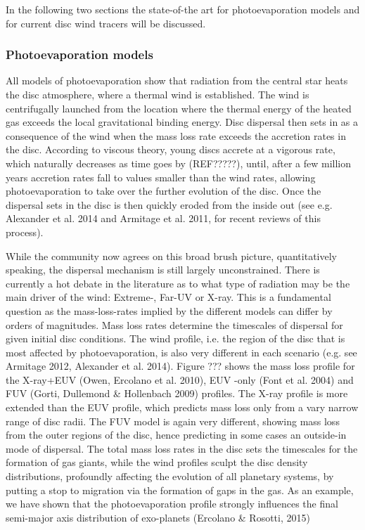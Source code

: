 \documentclass[10pt,fleqn,twoside]{article}
\begin{document}
In the following two sections the state-of-the art for photoevaporation
models and for current disc wind tracers will be discussed.
 
\subsubsection{Photoevaporation models} 

All models of photoevaporation show that radiation from the central
star heats the disc atmosphere, where a thermal  wind is established.
The wind is centrifugally launched from the location where the thermal
energy of the heated gas exceeds the local gravitational binding
energy. 
Disc dispersal then sets in as a consequence of the wind when the mass
loss rate exceeds the accretion rates in the disc. According to
viscous theory, young discs accrete
at a vigorous rate, which naturally decreases as time goes by (REF?????), until,
after a few million years accretion rates fall to values smaller than
the wind rates, allowing photoevaporation to take over the further
evolution of the disc. Once the dispersal sets in the disc is then
quickly eroded from the inside out (see e.g. Alexander et al. 2014 and
Armitage et al. 2011, for recent reviews of this process).  

While the community now agrees on this broad brush picture,
quantitatively speaking, the dispersal mechanism is still largely
unconstrained. There is currently a hot debate in the literature as to
what type of radiation may be the main driver of the wind: Extreme-,
Far-UV or X-ray. This is a fundamental question as the mass-loss-rates
implied by the different models can differ by orders of
magnitudes. Mass loss rates determine the timescales of dispersal for
given initial disc conditions. The wind profile, i.e. the region of
the disc that is most affected by photoevaporation, is also very
different in each scenario (e.g. see Armitage 2012, Alexander et
al. 2014). Figure ??? shows the mass loss profile for the X-ray+EUV
(Owen, Ercolano et al. 2010), EUV -only (Font et al. 2004) and FUV
(Gorti, Dullemond \& Hollenbach 2009) profiles. The X-ray profile is
more extended than the EUV profile, which predicts mass loss only from
a vary narrow range of disc radii. The FUV model is again very
different, showing mass loss from the outer regions of the disc, hence
predicting in some cases an outside-in mode of dispersal. The total
mass loss rates in the disc sets the timescales for the formation of
gas giants, while the wind
profiles sculpt the disc density distributions, profoundly affecting
the evolution of all planetary systems, by putting a stop to migration via
the formation of gaps in the gas. As an example, we have shown that
the photoevaporation profile strongly influences the final semi-major
axis distribution of exo-planets (Ercolano \& Rosotti, 2015) 
\end{document}
